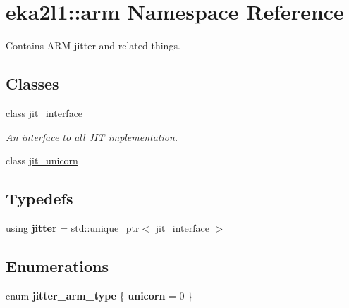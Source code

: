 \hypertarget{namespaceeka2l1_1_1arm}{}\section{eka2l1\+:\+:arm Namespace Reference}
\label{namespaceeka2l1_1_1arm}


Contains A\+RM jitter and related things.  


\subsection*{Classes}
\begin{DoxyCompactItemize}
\item 
class \mbox{\hyperlink{classeka2l1_1_1arm_1_1jit__interface}{jit\+\_\+interface}}
\begin{DoxyCompactList}\small\item\em An interface to all J\+IT implementation. \end{DoxyCompactList}\item 
class \mbox{\hyperlink{classeka2l1_1_1arm_1_1jit__unicorn}{jit\+\_\+unicorn}}
\end{DoxyCompactItemize}
\subsection*{Typedefs}
\begin{DoxyCompactItemize}
\item 
\mbox{\label{namespaceeka2l1_1_1arm_a694f91827829601b595780059bcfcbdd}} 
using {\bfseries jitter} = std\+::unique\+\_\+ptr$<$ \mbox{\hyperlink{classeka2l1_1_1arm_1_1jit__interface}{jit\+\_\+interface}} $>$
\end{DoxyCompactItemize}
\subsection*{Enumerations}
\begin{DoxyCompactItemize}
\item 
\mbox{\label{namespaceeka2l1_1_1arm_aeb32527b453554d35dd874c6195ed44b}} 
enum {\bfseries jitter\+\_\+arm\+\_\+type} \{ {\bfseries unicorn} = 0
 \}
\end{DoxyCompactItemize}
